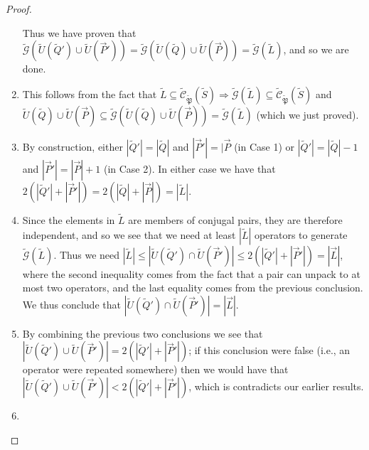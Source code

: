 \documentclass[12pt]{amsbook}
\theoremstyle{plain}
\theoremstyle{definition}
\theoremstyle{remark}
\newcommand{\lst}{\vec}
\newcommand{\set}{\tilde}
\newcommand{\genfun}{\tilde{\mathcal{G}}}
\newcommand{\pauligroup}{{\set{\mathfrak{P}}}}
\newcommand{\centralizer}{\set{\mathcal{C}}}
\newcommand{\paren}[1]{\left(#1\right)}
\begin{document}
\begin{proof}
\begin{enumerate}
Thus we have proven that $\genfun\paren{\set U(\set Q')\cup\set U(\lst P')}=\genfun\paren{\set U(\set Q)\cup\set U(\lst P)}=\genfun(\set L)$, and so we are done.
\item

This follows from the fact that $\set L\subseteq\centralizer_\pauligroup(\set S)\Rightarrow\genfun(\set L)\subseteq\centralizer_\pauligroup(\set S)$ and $\set U(\set Q)\cup\set U(\lst P)\subseteq\genfun\paren{\set U(\set Q)\cup\set U(\lst P)}=\genfun(\set L)$ (which we just proved).
\item

By construction, either $|\set Q'|=|\set Q|$ and $|\lst P'|=|\lst P$ (in Case 1) or $|\set Q'|=|\set Q|-1$ and $|\lst P'|=|\lst P|+1$ (in Case 2).  In either case we have that $2(|\set Q'|+|\lst P'|)=2(|\set Q|+|\lst P|)=|\set L|$.
\item

Since the elements in $\set L$ are members of conjugal pairs, they are therefore independent, and so we see that we need at least $|\set L|$ operators to generate $\genfun(\set L)$.  Thus we need $|\set L|\le|\set U(\set Q')\cap\set U(\lst P')|\le 2(|\set Q'|+|\lst P'|)=|\lst L|$,  where the second inequality comes from the fact that a pair can unpack to at most two operators, and the last equality comes from the previous conclusion.  We thus conclude that $|\set U(\set Q')\cap\set U(\lst P')|=|\lst L|$.
\item

By combining the previous two conclusions we see that $|\set U(\set Q')\cup\set U(\lst P')|=2(|\set Q'|+|\lst P'|)$;  if this conclusion were false (i.e., an operator were repeated somewhere) then we would have that $|\set U(\set Q')\cup\set U(\lst P')|<2(|\set Q'|+|\lst P'|)$, which is contradicts our earlier results.
\item


\end{enumerate}
\end{proof}
\end{document}

